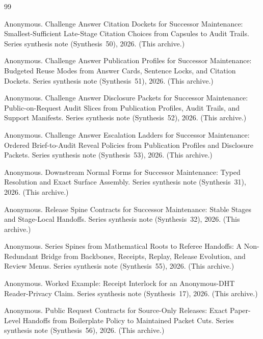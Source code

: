 \documentclass[11pt]{article}
\begin{document}
\begin{thebibliography}{99}\small

Anonymous.
\newblock Challenge Answer Citation Dockets for Successor Maintenance: Smallest-Sufficient Late-Stage Citation Choices from Capsules to Audit Trails.
\newblock Series synthesis note (Synthesis~50), 2026. (This archive.)

Anonymous.
\newblock Challenge Answer Publication Profiles for Successor Maintenance: Budgeted Reuse Modes from Answer Cards, Sentence Locks, and Citation Dockets.
\newblock Series synthesis note (Synthesis~51), 2026. (This archive.)

Anonymous.
\newblock Challenge Answer Disclosure Packets for Successor Maintenance: Public-on-Request Audit Slices from Publication Profiles, Audit Trails, and Support Manifests.
\newblock Series synthesis note (Synthesis~52), 2026. (This archive.)

Anonymous.
\newblock Challenge Answer Escalation Ladders for Successor Maintenance: Ordered Brief-to-Audit Reveal Policies from Publication Profiles and Disclosure Packets.
\newblock Series synthesis note (Synthesis~53), 2026. (This archive.)

Anonymous.
\newblock Downstream Normal Forms for Successor Maintenance: Typed Resolution and Exact Surface Assembly.
\newblock Series synthesis note (Synthesis~31), 2026. (This archive.)

Anonymous.
\newblock Release Spine Contracts for Successor Maintenance: Stable Stages and Stage-Local Handoffs.
\newblock Series synthesis note (Synthesis~32), 2026. (This archive.)

Anonymous.
\newblock Series Spines from Mathematical Roots to Referee Handoffs: A Non-Redundant Bridge from Backbones, Receipts, Replay, Release Evolution, and Review Menus.
\newblock Series synthesis note (Synthesis~55), 2026. (This archive.)

Anonymous.
\newblock Worked Example: Receipt Interlock for an Anonymous-DHT Reader-Privacy Claim.
\newblock Series synthesis note (Synthesis~17), 2026. (This archive.)

Anonymous.
\newblock Public Request Contracts for Source-Only Releases: Exact Paper-Level Handoffs from Boilerplate Policy to Maintained Packet Cuts.
\newblock Series synthesis note (Synthesis~56), 2026. (This archive.)


\end{thebibliography}
\end{document}

